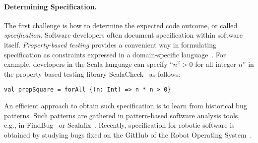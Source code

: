 \documentclass[fleqn,12pt]{article}
\begin{document}
\paragraph{Determining Specification.}
The first challenge is how to determine the expected code outcome, or
called \emph{specification}.  Software developers often document
specification within software itself.  \emph{Property-based testing}
provides a convenient way in formulating specification as constraints
expressed in a domain-specific
language~\cite{DBLP:conf/icfp/ClaessenH00}.  For example, developers
in the Scala language can specify ``$n^2>0$ for all integer $n$'' in the
property-based testing library ScalaCheck~\cite{nilsson2014scalacheck}
as follows:
\begin{lstlisting}[numbers=none]
val propSquare = forAll {(n: Int) => n * n > 0}
\end{lstlisting}
An efficient approach to obtain such specification is to learn from
historical bug patterns. Such patterns are gathered in pattern-based
software analysis tools, e.g., in
FindBug~\cite{DBLP:conf/paste/AyewahPMPZ07} or
Scalafix~\cite{web:scalafix}.  Recently, specification for robotic
software is obtained by studying bugs fixed on the GitHub of the Robot
Operating System~\cite{nielsenFSW2020dependencybugs}.






\end{document}

